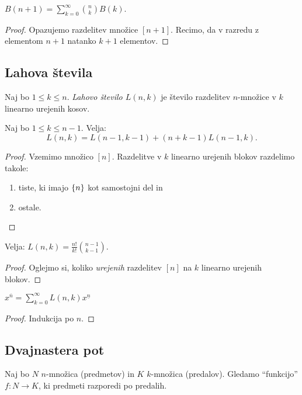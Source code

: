 \begin{trditev}
    $B(n+1) = \sum_{k=0}^{\infty} \binom{n}{k} B(k)$.
\end{trditev}

\begin{proof}
    Opazujemo razdelitev množice \([n+1]\). Recimo, da v razredu z elementom \(n+1\) natanko \(k+1\) elementov.
\end{proof}

\newpage
\subsection{Lahova števila}
\begin{definicija}
    Naj bo $1 \leq k \leq n$. \emph{Lahovo število $L(n,k)$} je število razdelitev $n$-množice v $k$ linearno urejenih kosov.
\end{definicija}

\begin{trditev}
    Naj bo \(1 \leq k \leq n - 1\). Velja: 
    \[L(n, k) = L(n - 1, k - 1) + (n + k - 1)L(n - 1, k).\]
\end{trditev}

\begin{proof}
    Vzemimo množico $[n]$. Razdelitve v $k$ linearno urejenih blokov razdelimo takole:
    \begin{enumerate}
        \item tiste, ki imajo $\left\{n\right\}$ kot samostojni del in
        \item ostale. \qedhere
    \end{enumerate}
\end{proof}

\begin{trditev}
    Velja: \(L(n,k) = \frac{n!}{k!} \binom{n-1}{k-1}\).
\end{trditev}

\begin{proof}
    Oglejmo si, koliko \emph{urejenih} razdelitev \([n]\) na \(k\) linearno urejenih blokov.
\end{proof}

\begin{trditev}
    \(x^{\overline{n}} = \sum_{k=0}^{\infty} L(n,k)x^{\underline{n}}\)
\end{trditev}

\begin{proof}
    Indukcija po \(n\).
\end{proof}

\subsection{Dvajnastera pot}
Naj bo $N$ $n$-množica (predmetov) in $K$ $k$-množica (predalov). 
Gledamo "`funkcijo"' $f: N \to K$, ki predmeti razporedi po predalih.

